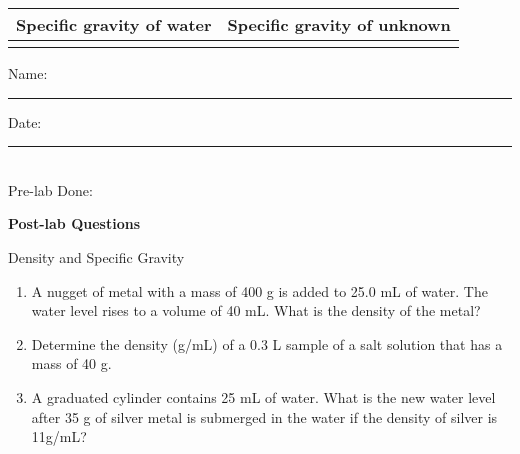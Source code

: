 \documentclass[main.tex]{subfiles}
\begin{document}
\begin{center}\begin{tabular}{ |p{6cm}|p{6cm}|  }
\hline
         Specific gravity of water   & Specific gravity of unknown        \\
\hline
   \vspace{0cm}\vspace{.5cm}       &            \\
\hline
\end{tabular}\end{center}



\newpage
\begin{multicols}{2}
\begin{tcolorbox}[enhanced jigsaw,breakable,size=title,
colback=mybrown!05,colframe=black,fonttitle=\bfseries,
title=STUDENT INFO,pad at break=1mm, break at=15cm/0pt ]
\vspace{0.2cm}
\noindent Name: \rule{5cm}{0.4pt}Date:\rule{1cm}{0.4pt}\\
Pre-lab Done: \quad
\end{tcolorbox}
\end{multicols}
\hfill
\vspace{0.2cm}
\begin{center}
{\large \bfseries 
Post-lab Questions 
\par
\Huge
Density and Specific Gravity
\\[5pt] \par}
\vspace{0.2cm}
\end{center}
\par
\noindent
\uline{  \hfill \normalsize \hfill       }




\begin{enumerate}
\item 
A nugget of metal with a mass of 400 g is added to 25.0 mL of water.  The water level rises to a volume of 40 mL.  What is the density of the metal?   

\vspace{2.5cm}
\item Determine the density (g/mL) of a 0.3 L sample of a salt solution that has a mass of 40 g.
\vspace{2.5cm}

\item A graduated cylinder contains 25 mL of water. What is the new water level after
35 g of silver metal is submerged in the water if the density of silver is 11g/mL?\vspace{2.5cm}

\end{enumerate}



\clearpage\mbox{}\clearpage
\end{document}

